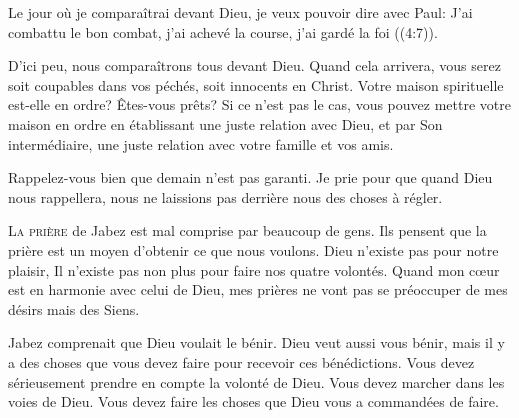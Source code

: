 
Le jour où je comparaîtrai devant Dieu, je veux pouvoir dire avec Paul:
 \Og J'ai combattu le bon combat, j'ai achevé la course,
 j'ai gardé la foi \Fg{} ((4:7)). 

D'ici peu, nous comparaîtrons tous devant Dieu. Quand cela arrivera,
 vous serez soit coupables dans vos péchés, soit innocents en Christ.
 Votre maison spirituelle est-elle en ordre? Êtes-vous prêts?
 Si ce n'est pas le cas, vous pouvez mettre votre maison en ordre
 en établissant une juste relation avec Dieu, et par Son intermédiaire,
 une juste relation avec votre famille et vos amis. 

Rappelez-vous bien que demain n'est pas garanti. Je prie pour que quand Dieu
 nous rappellera, nous ne laissions pas derrière nous des choses à régler. 

\dvrule






\lettrine{L}{a prière} de Jabez est mal comprise par beaucoup de gens.
 Ils pensent que la prière est un moyen d'obtenir ce que nous voulons.
 Dieu n'existe pas pour notre plaisir, Il n'existe pas non plus pour faire
 nos quatre volontés.
 Quand mon c\oe{}ur est en harmonie avec celui de Dieu,
 mes prières ne vont pas se préoccuper de mes désirs mais des Siens. 


Jabez comprenait que Dieu voulait le bénir. Dieu veut aussi vous bénir,
 mais il y a des choses que vous devez faire pour recevoir ces bénédictions.
 Vous devez sérieusement prendre en compte la volonté de Dieu.
 Vous devez marcher dans les voies de Dieu.
 Vous devez faire les choses que Dieu vous a commandées de faire. 

